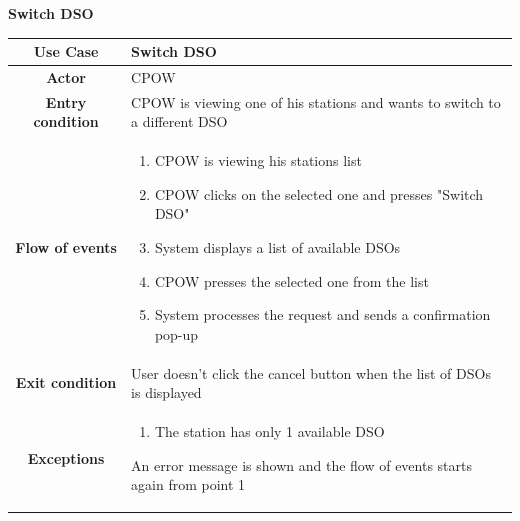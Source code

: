 \documentclass[table, 12pt]{article} %
\begin{document}
\begin{itemize}
             \begin{table}[H]
                \item[] \textbf{Switch DSO}
                \item[]
                \centering
                \begin{tabular}{|c |m{}|}
                    \hline
                    \textbf{Use Case} & Switch DSO\\ \hline
                    \textbf{Actor} & CPOW\\ \hline
                    \textbf{Entry condition} & CPOW is viewing one of his stations and wants to switch to a different DSO\\  \hline
                    \textbf{Flow of events} & \begin{enumerate}
                                                \item CPOW is viewing his stations list
                                                \item CPOW clicks on the selected one and presses "Switch DSO"
                                                \item System displays a list of available DSOs
                                                \item CPOW presses the selected one from the list
                                                \item System processes the request and sends a confirmation pop-up
                                            \end{enumerate}\\ \hline
                    \textbf{Exit condition} &  User doesn't click the cancel button when the list of DSOs is displayed\\ \hline
                    \textbf{Exceptions} &  \begin{enumerate}
                        \item The station has only 1 available DSO
                    \end{enumerate}
                    An error message is shown and the flow of events starts again from point 1\\ \hline
                \end{tabular}
            \end{table}







            \newpage
        

\end{itemize}
\end{document}
